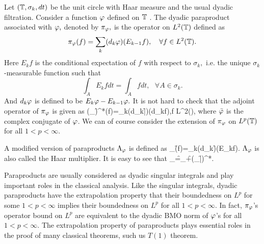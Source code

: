 Let $({{\mathbb T}},\sigma_k,dt)$ be the unit circle with Haar measure and
the usual dyadic filtration. Consider a function $\varphi$ defined on ${\Bbb {T}}$%
. The dyadic paraproduct associated with $\varphi,$ denoted by $\pi _\varphi,$ is the
operator on $L^2({\Bbb {T}})$ defined as
\begin{equation}
\pi _\varphi(f)=\sum_k(d_k\varphi)(E_{k-1}f),\quad \forall f\in L^2({\Bbb {T}}).
\label{def}
\end{equation}
Here $E_kf$ is the conditional expectation of $f$ with respect to $\sigma
_k,$ i.e. the unique $\sigma_k$-measurable function such that
\[
\int_AE_kfdt=\int_Afdt,\ \ \ \forall A\in {\sigma}_k.
\]
And $d_k\varphi$ is defined to be $E_k\varphi-E_{k-1}\varphi.$ It is not hard to
check that the adjoint operator of $\pi_\varphi$ is given as \be
(\pi_\f)^*(f)=\sum_k(d_k{\bar \f})(d_kf),\quad \forall f\in
L^2({}), \ee where $\bar{\varphi}$ is the complex conjugate of
$\varphi$.
 We can
of course consider the extension of $\pi _\varphi$ on $L^p({\Bbb {T}})$
for all $1<p<\infty .$

A modified version of paraproducts $\Lambda_\varphi$ is defined as \be
\Lambda_\f(f)=\sum_k(d_k\f)(E_kf). \label{defL} \ee $\Lambda_\varphi$ is
also called the Haar multiplier. It is easy to see that \be
\Lambda_\f=\pi_\f+(\pi_{\bar\f})^*.\ee

Paraproducts are usually considered as dyadic singular integrals and
play important roles in the classical analysis. Like the singular
integrals, dyadic paraproducts have the extrapolation property that
their boundedness on $L^p$ for some $1<p<\infty$ implies their
boundedness on $L^p$ for all $1<p<\infty$.
In fact, $\pi_\varphi$'s operator bound on $L^p$ are equivalent to the
dyadic BMO norm of $\varphi$'s for all $1<p<\infty$. The extrapolation
property of paraproducts plays essential roles in the proof of many
classical theorems, such us $T(1)$ theorem.

